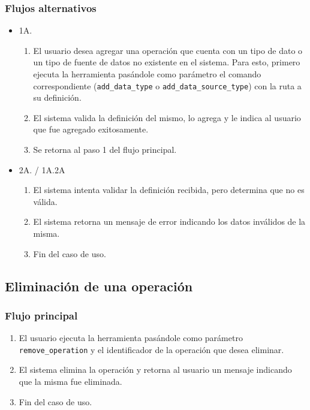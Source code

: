 \subsubsection*{Flujos alternativos}
\begin{itemize}
\item 1A.
    \begin{enumerate}
    \item \begin{sloppypar} El usuario desea agregar una operación que cuenta con un tipo de dato o un tipo de fuente de datos no existente en el sistema. Para esto, primero ejecuta la herramienta pasándole como parámetro el comando correspondiente (\texttt{add\_data\_type} o \texttt{add\_data\_source\_type}) con la ruta a su definición. \end{sloppypar}
    \item El sistema valida la definición del mismo, lo agrega y le indica al usuario que fue agregado exitosamente.
    \item Se retorna al paso 1 del flujo principal.
    \end{enumerate}
    
\item 2A. / 1A.2A
    \begin{enumerate}
    \item El sistema intenta validar la definición recibida, pero determina que no es válida.
    \item El sistema retorna un mensaje de error indicando los datos inválidos de la misma.
    \item Fin del caso de uso.
    \end{enumerate}
\end{itemize}

\subsection{Eliminación de una operación}

\subsubsection*{Flujo principal}
\begin{enumerate}
\item \begin{sloppypar} El usuario ejecuta la herramienta pasándole como parámetro \texttt{remove\_operation} y el identificador de la operación que desea eliminar.\end{sloppypar}
\item El sistema elimina la operación y retorna al usuario un mensaje indicando que la misma fue eliminada.
\item Fin del caso de uso.
\end{enumerate}

